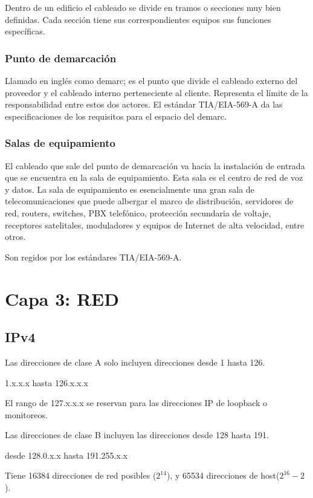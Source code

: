 Dentro de un edificio el cableado se divide en tramos o secciones muy bien definidas. Cada sección tiene sus correspondientes equipos  sus funciones específicas.

\subsubsection{Punto de demarcación}

Llamado en inglés como demarc; es el punto que divide el cableado externo del proveedor y el cableado interno perteneciente al cliente. Representa el límite de la responsabilidad entre estos dos actores. El estándar TIA/EIA-569-A da las especificaciones de los requisitos para el espacio del demarc.

\subsubsection{Salas de equipamiento}

El cableado que sale del punto de demarcación va hacia la instalación de entrada que se encuentra en la sala de equipamiento. Esta sala es el centro de red de voz y datos. La sala de equipamiento es esencialmente una gran sala de telecomunicaciones que puede albergar el marco de distribución, servidores de red, routers, switches, PBX telefónico, protección secundaria de voltaje, receptores satelitales, moduladores y equipos de Internet de alta velocidad, entre otros.

Son regidos por los estándares TIA/EIA-569-A.

\section{Capa 3: RED}


\subsection{IPv4}



Las direcciones de clase A solo incluyen direcciones desde 1 hasta 126.

1.x.x.x hasta 126.x.x.x

El rango de 127.x.x.x se reservan para las direcciones IP de loopback o monitoreos.

Las direcciones de clase B incluyen las direcciones desde 128 hasta 191.

desde 128.0.x.x hasta 191.255.x.x

Tiene 16384 direcciones de red posibles ($2^14$), y 65534 direcciones de host($2^16-2$).

